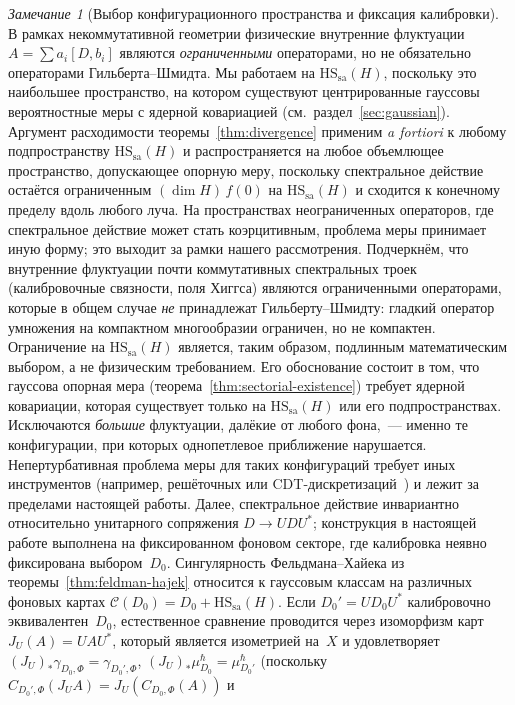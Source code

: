 \documentclass[12pt,a4paper]{article}
\theoremstyle{plain}
\theoremstyle{definition}
\theoremstyle{remark}
\newtheorem{remark}[theorem]{Замечание}
\newcommand{\HS}{\mathrm{HS}}
\newcommand{\sa}{\mathrm{sa}}
\begin{document}
\begin{remark}[Выбор конфигурационного пространства и фиксация калибровки]
\label{rem:HS-choice}
В рамках некоммутативной геометрии физические внутренние
флуктуации $A = \sum a_i[D,b_i]$ являются \emph{ограниченными}
операторами, но не обязательно операторами Гильберта--Шмидта.
Мы работаем на $\HS_\sa(H)$, поскольку это наибольшее пространство,
на котором существуют центрированные гауссовы вероятностные меры с
ядерной ковариацией (см.\ раздел~\ref{sec:gaussian}).
Аргумент расходимости теоремы~\ref{thm:divergence} применим
\emph{a fortiori} к любому подпространству $\HS_\sa(H)$ и
распространяется на любое объемлющее пространство, допускающее
опорную меру, поскольку спектральное действие остаётся ограниченным
$(\dim H)\,f(0)$ на $\HS_\sa(H)$ и сходится к конечному пределу
вдоль любого луча.  На пространствах неограниченных операторов, где
спектральное действие может стать коэрцитивным, проблема меры
принимает иную форму; это выходит за рамки нашего рассмотрения.
Подчеркнём, что внутренние флуктуации почти коммутативных спектральных
троек (калибровочные связности, поля Хиггса) являются ограниченными
операторами, которые в общем случае \emph{не} принадлежат
Гильберту--Шмидту: гладкий оператор умножения на компактном
многообразии ограничен, но не компактен.
Ограничение на $\HS_\sa(H)$ является, таким образом, подлинным
математическим выбором, а не физическим требованием.  Его
обоснование состоит в том, что гауссова опорная мера
(теорема~\ref{thm:sectorial-existence}) требует ядерной ковариации,
которая существует только на $\HS_\sa(H)$ или его подпространствах.
Исключаются \emph{большие} флуктуации, далёкие от любого фона,~---
именно те конфигурации, при которых однопетлевое приближение
нарушается.  Непертурбативная проблема меры для таких конфигураций
требует иных инструментов (например, решёточных или
CDT-дискретизаций~\cite{AJL:2012}) и лежит за пределами настоящей
работы.
Далее, спектральное действие инвариантно относительно унитарного
сопряжения $D \to UDU^*$; конструкция в настоящей работе выполнена
на фиксированном фоновом секторе, где калибровка неявно фиксирована
выбором~$D_0$.
Сингулярность Фельдмана--Хайека из теоремы~\ref{thm:feldman-hajek}
относится к гауссовым классам на различных фоновых картах
$\mathcal{C}(D_0) = D_0 + \HS_\sa(H)$.
Если $D_0' = UD_0U^*$ калибровочно эквивалентен~$D_0$,
естественное сравнение проводится через изоморфизм карт
$J_U(A) = UAU^*$, который является изометрией на~$X$ и удовлетворяет
$(J_U)_*\gamma_{D_0,\Phi} = \gamma_{D_0',\Phi}$,
$(J_U)_*\mu^\hbar_{D_0} = \mu^\hbar_{D_0'}$
(поскольку $C_{D_0',\Phi}(J_U A) = J_U(C_{D_0,\Phi}(A))$ и

\end{remark}
\end{document}
